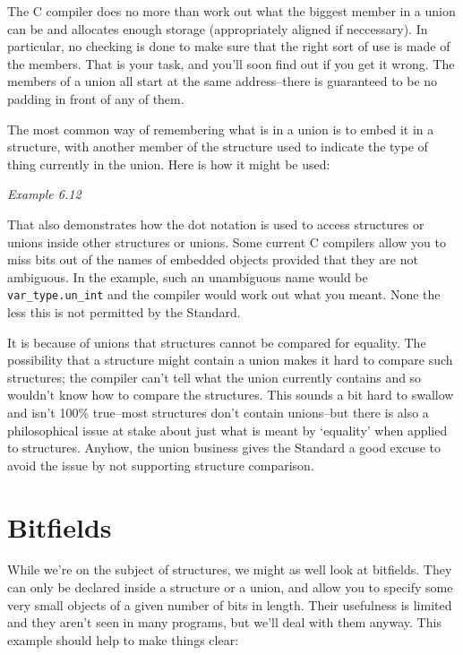   The C compiler does no more than work out what the biggest member in
   a union can be and allocates enough storage (appropriately aligned if
   neccessary). In particular, no checking is done to make sure that the right
   sort of use is made of the members. That is your task, and you'll soon find
   out if you get it wrong. The members of a union all start at the same
   address--there is guaranteed to be no padding in front of any of
   them.


  The most common way of remembering what is in a union is to embed it in
   a structure, with another member of the structure used to indicate the type
   of thing currently in the union. Here is how it might be used:


   \begin{center}\textit{Example 6.12}\end{center}


  That also demonstrates how the dot notation is used to access structures
   or unions inside other structures or unions. Some current C compilers allow
   you to miss bits out of the names of embedded objects provided that they are
   not ambiguous. In the example, such an unambiguous name would be
   \texttt{var\_type.un\_int} and the compiler would work out what you meant.
   None the less this is not permitted by the Standard.


  It is because of unions that structures cannot be compared for equality.
   The possibility that a structure might contain a union makes it hard to
   compare such structures; the compiler can't tell what the union currently
   contains and so wouldn't know how to compare the structures. This sounds
   a bit hard to swallow and isn't 100\% true--most structures don't contain
   unions--but there is also a philosophical issue at stake about just what
   is meant by `equality' when applied to structures. Anyhow, the union
   business gives the Standard a good excuse to avoid the issue by not
   supporting structure comparison.


 
        \section{Bitfields}\label{sec:bitfields}
        

  

  While we're on the subject of structures, we might as well look at
   bitfields. They can only be declared inside a structure or a union, and
   allow you to specify some very small objects of a given number of bits in
   length.  Their usefulness is limited and they aren't seen in many programs,
   but we'll deal with them anyway. This example should help to make things
   clear:


